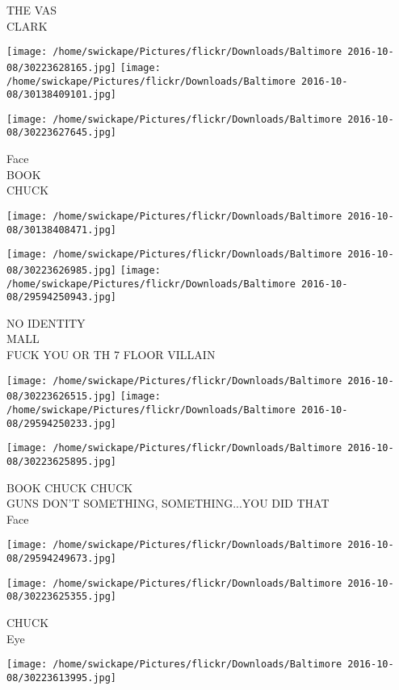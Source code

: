 \documentclass[10pt,letterpaper]{article}
\begin{document}
THE VAS\\
CLARK
\pagebreak

\texttt{[image: /home/swickape/Pictures/flickr/Downloads/Baltimore 2016-10-08/30223628165.jpg]}
\texttt{[image: /home/swickape/Pictures/flickr/Downloads/Baltimore 2016-10-08/30138409101.jpg]}

\texttt{[image: /home/swickape/Pictures/flickr/Downloads/Baltimore 2016-10-08/30223627645.jpg]}

Face\\
BOOK\\
CHUCK
\pagebreak

\texttt{[image: /home/swickape/Pictures/flickr/Downloads/Baltimore 2016-10-08/30138408471.jpg]}

\vspace{0.25in}
\texttt{[image: /home/swickape/Pictures/flickr/Downloads/Baltimore 2016-10-08/30223626985.jpg]}
\texttt{[image: /home/swickape/Pictures/flickr/Downloads/Baltimore 2016-10-08/29594250943.jpg]}

NO IDENTITY\\
MALL\\
FUCK YOU OR TH 7 FLOOR VILLAIN
\pagebreak

\texttt{[image: /home/swickape/Pictures/flickr/Downloads/Baltimore 2016-10-08/30223626515.jpg]}
\texttt{[image: /home/swickape/Pictures/flickr/Downloads/Baltimore 2016-10-08/29594250233.jpg]}

\vspace{0.25in}
\texttt{[image: /home/swickape/Pictures/flickr/Downloads/Baltimore 2016-10-08/30223625895.jpg]}

BOOK CHUCK CHUCK\\
GUNS DON'T SOMETHING, SOMETHING...YOU DID THAT\\
Face
\pagebreak

\texttt{[image: /home/swickape/Pictures/flickr/Downloads/Baltimore 2016-10-08/29594249673.jpg]}

\vspace{0.25in}
\texttt{[image: /home/swickape/Pictures/flickr/Downloads/Baltimore 2016-10-08/30223625355.jpg]}

CHUCK\\
Eye
\pagebreak

\texttt{[image: /home/swickape/Pictures/flickr/Downloads/Baltimore 2016-10-08/30223613995.jpg]}
\end{document}
